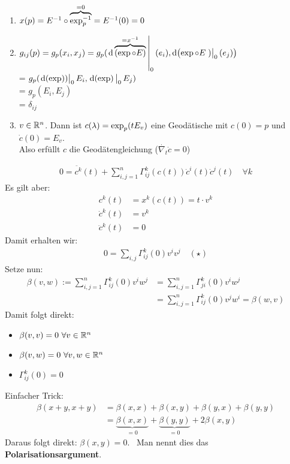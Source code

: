 \begin{bew}
\begin{enumerate}
\item $x(p)=E^{-1} \circ \overbrace{\operatorname{exp}_p^{-1}}^{= 0} = E^{-1}(0) = 0$
\item $g_{ij}(p)=g_p(x_i, x_j) = g_p(\eval{\dd\overbrace{(\expp \circ E)}^{= x^{-1}}}_{0}(e_i), \dd(\expp \circ E\eval{)}_{0}(e_j))$ \\
 = $g_p(\eval{\dd(\expp))}_{0}E_i, \eval{\dd(\expp)}_{0}E_j)$ \\
 =  $g_p(E_i, E_j)$ \\
 = $\delta_{ij}$
\item $v \in \mathbb{R}^n$. Dann ist $c(\lambda)=\operatorname{exp}_p(t E_v)$ eine Geodätische mit $c(0)=p$ und $\dot{c}(0) = E_v$. \\
Also erfüllt $c$ die Geodätengleichung ($\dot{\nabla_t}\dot{c} = 0$) \\
\end{enumerate}
\begin{align*}
0 =  \ddot{c^k}(t) + \sum_{i, j = 1}^{n} \Gamma_{ij}^k(c(t))\dot{c}^{i}(t)\dot{c}^j(t) \quad \forall k
\end{align*}
Es gilt aber:
\begin{align*}
c^k(t) &= x^k(c(t)) = t\cdot v^k \\
\dot{c}^k(t) &= v^k \\
\ddot{c}^k(t) &= 0
\end{align*}
Damit erhalten wir: 
\begin{align*}
0=\sum_{i,j} \Gamma_{ij}^k(0)v^{i}v^j \quad (\star)
\end{align*}
Setze nun: 
\begin{align*}
\beta(v,w):= \sum_{i, j = 1}^n\Gamma_{ij}^k(0)v^{i}w^{j} &=  \sum_{i,j=1}^n\Gamma_{ji}^k(0)v^{i}w^{j} \\
&= \sum_{i, j = 1}^n\Gamma_{ij}^k(0)v^{j}w^{i} = \beta(w, v)
\end{align*}
\newpage
Damit folgt direkt:
\begin{itemize}
\item $\beta(v, v) = 0 \ \forall v \in \mathbb{R}^n$
\item $\beta(v, w) = 0 \ \forall v,w \in \mathbb{R}^n$
\item $\Gamma_{ij}^k(0) = 0 $
\end{itemize}
\end{bew}
Einfacher Trick:
\begin{align*}
\beta(x+y, x+y) &= \beta(x, x) +  \beta(x, y) + \beta(y, x) + \beta(y, y)  \\
&= \underbrace{\beta(x, x)}_{= 0} + \underbrace{\beta(y, y)}_{= 0} + 2\beta(x, y)
\end{align*}
Daraus folgt direkt: $\beta(x,y) = 0$. \
Man nennt dies das \textbf{Polarisationsargument}.
